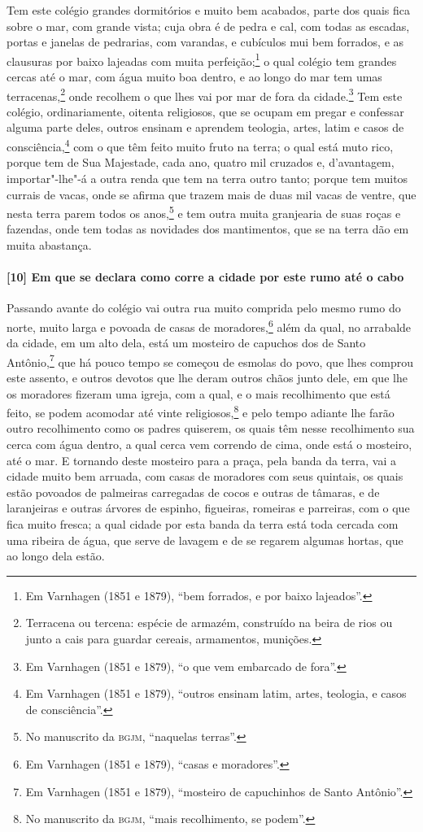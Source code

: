 \begin{linenumbers}
Tem este colégio grandes dormitórios e muito bem acabados, parte dos quais fica sobre o
mar, com grande vista; cuja obra é de pedra e cal, com todas as escadas, portas e janelas
de pedrarias, com varandas, e cubículos mui bem forrados, e as clausuras por baixo
lajeadas com muita perfeição;\footnote{ Em Varnhagen (1851 e 1879), ``bem forrados, e por
baixo lajeados''.} o qual colégio tem grandes cercas até o mar, com água muito boa dentro,
e ao longo do mar tem umas terracenas,\footnote{ Terracena ou tercena: espécie de armazém,
construído na beira de rios ou junto a cais para guardar cereais, armamentos, munições.}
onde recolhem o que lhes vai por mar de fora da cidade.\footnote{ Em Varnhagen (1851 e
1879), ``o que vem embarcado de fora''.} Tem este colégio, ordinariamente, oitenta
religiosos, que se ocupam em pregar e confessar alguma parte deles, outros ensinam e
aprendem teologia, artes, latim e casos de consciência,\footnote{ Em Varnhagen (1851 e
1879), ``outros ensinam latim, artes, teologia, e casos de consciência''.} com o que têm
feito muito fruto na terra; o qual está muto rico, porque tem de Sua Majestade, cada ano,
quatro mil cruzados e, d'avantagem, importar"-lhe"-á a outra renda que tem na terra outro
tanto; porque tem muitos currais de vacas, onde se afirma que trazem mais de duas mil
vacas de ventre, que nesta terra parem todos os anos,\footnote{ No manuscrito da
\textsc{bgjm}, ``naquelas terras''.} e tem outra muita granjearia de suas roças e
fazendas, onde tem todas as novidades dos mantimentos, que se na terra dão em muita
abastança.

\paragraph{[10] Em que se declara como corre a cidade por este rumo até o cabo} \quad
Passando avante do colégio vai outra rua muito comprida pelo mesmo rumo do norte, muito
larga e povoada de casas de moradores,\footnote{ Em Varnhagen (1851 e 1879), ``casas e
moradores''.} além da qual, no arrabalde da cidade, em um alto dela, está um mosteiro de
capuchos dos de Santo Antônio,\footnote{ Em Varnhagen (1851 e 1879), ``mosteiro de
capuchinhos de Santo Antônio''.} que há pouco tempo se começou de esmolas do povo, que
lhes comprou este assento, e outros devotos que lhe deram outros chãos junto dele, em que
lhe os moradores fizeram uma igreja, com a qual, e o mais recolhimento que está feito, se
podem acomodar até vinte religiosos,\footnote{ No manuscrito da \textsc{bgjm}, ``mais
recolhimento, se podem''.} e pelo tempo adiante lhe farão outro recolhimento como os
padres quiserem, os quais têm nesse recolhimento sua cerca com água dentro, a qual cerca
vem correndo de cima, onde está o mosteiro, até o mar. E tornando deste mosteiro para a
praça, pela banda da terra, vai a cidade muito bem arruada, com casas de moradores com
seus quintais, os quais estão povoados de palmeiras carregadas de cocos e outras de
tâmaras, e de laranjeiras e outras árvores de espinho, figueiras, romeiras e parreiras,
com o que fica muito fresca; a qual cidade por esta banda da terra está toda cercada com
uma ribeira de água, que serve de lavagem e de se regarem algumas hortas, que ao longo
dela estão.


\end{linenumbers}
